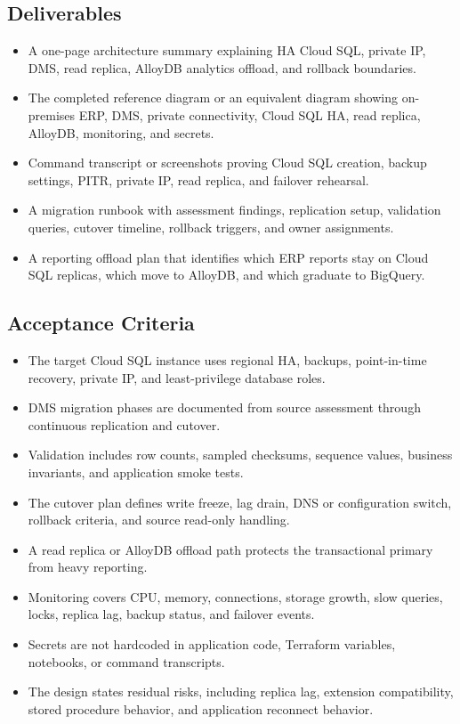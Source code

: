\subsection*{Deliverables}
\begin{itemize}
    \item A one-page architecture summary explaining HA Cloud SQL, private IP, DMS, read replica, AlloyDB analytics offload, and rollback boundaries.
    \item The completed reference diagram or an equivalent diagram showing on-premises ERP, DMS, private connectivity, Cloud SQL HA, read replica, AlloyDB, monitoring, and secrets.
    \item Command transcript or screenshots proving Cloud SQL creation, backup settings, PITR, private IP, read replica, and failover rehearsal.
    \item A migration runbook with assessment findings, replication setup, validation queries, cutover timeline, rollback triggers, and owner assignments.
    \item A reporting offload plan that identifies which ERP reports stay on Cloud SQL replicas, which move to AlloyDB, and which graduate to BigQuery.
\end{itemize}

\subsection*{Acceptance Criteria}
\begin{itemize}
    \item The target Cloud SQL instance uses regional HA, backups, point-in-time recovery, private IP, and least-privilege database roles.
    \item DMS migration phases are documented from source assessment through continuous replication and cutover.
    \item Validation includes row counts, sampled checksums, sequence values, business invariants, and application smoke tests.
    \item The cutover plan defines write freeze, lag drain, DNS or configuration switch, rollback criteria, and source read-only handling.
    \item A read replica or AlloyDB offload path protects the transactional primary from heavy reporting.
    \item Monitoring covers CPU, memory, connections, storage growth, slow queries, locks, replica lag, backup status, and failover events.
    \item Secrets are not hardcoded in application code, Terraform variables, notebooks, or command transcripts.
    \item The design states residual risks, including replica lag, extension compatibility, stored procedure behavior, and application reconnect behavior.
\end{itemize}

